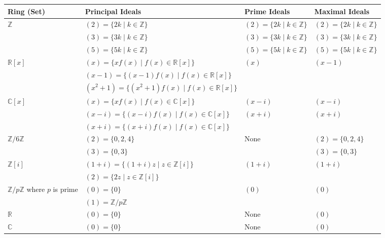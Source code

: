 \documentclass[11pt,openany]{article}
\begin{document}
	\begin{center}
		\begin{tabular}{|>{\centering\arraybackslash}m{4cm}|>{\centering\arraybackslash}m{4cm}|>{\centering\arraybackslash}m{4cm}|>{\centering\arraybackslash}m{4cm}|}
			\hline
			\textbf{Ring (Set)} & \textbf{Principal Ideals} & \textbf{Prime Ideals} & \textbf{Maximal Ideals} \\
			\hline
			\(\mathbb{Z}\) & \((2) = \{2k \mid k \in \mathbb{Z}\}\) & \((2) = \{2k \mid k \in \mathbb{Z}\}\) & \((2) = \{2k \mid k \in \mathbb{Z}\}\) \\
			& \((3) = \{3k \mid k \in \mathbb{Z}\}\) & \((3) = \{3k \mid k \in \mathbb{Z}\}\) & \((3) = \{3k \mid k \in \mathbb{Z}\}\) \\
			& \((5) = \{5k \mid k \in \mathbb{Z}\}\) & \((5) = \{5k \mid k \in \mathbb{Z}\}\) & \((5) = \{5k \mid k \in \mathbb{Z}\}\) \\
			\hline
			\(\mathbb{R}[x]\) & \((x) = \{x f(x) \mid f(x) \in \mathbb{R}[x]\}\) & \((x)\) & \((x-1)\) \\
			& \((x-1) = \{(x-1) f(x) \mid f(x) \in \mathbb{R}[x]\}\) &  &  \\
			& \((x^2+1) = \{(x^2+1) f(x) \mid f(x) \in \mathbb{R}[x]\}\) &  &  \\
			\hline
			\(\mathbb{C}[x]\) & \((x) = \{x f(x) \mid f(x) \in \mathbb{C}[x]\}\) & \((x-i)\) & \((x-i)\) \\
			& \((x-i) = \{(x-i) f(x) \mid f(x) \in \mathbb{C}[x]\}\) & \((x+i)\) & \((x+i)\) \\
			& \((x+i) = \{(x+i) f(x) \mid f(x) \in \mathbb{C}[x]\}\) &  &  \\
			\hline
			\(\mathbb{Z}/6\mathbb{Z}\) & \((2) = \{0, 2, 4\}\) & None & \((2) = \{0, 2, 4\}\) \\
			& \((3) = \{0, 3\}\) &  & \((3) = \{0, 3\}\) \\
			\hline
			\(\mathbb{Z}[i]\) & \((1+i) = \{(1+i) z \mid z \in \mathbb{Z}[i]\}\) & \((1+i)\) & \((1+i)\) \\
			& \((2) = \{2 z \mid z \in \mathbb{Z}[i]\}\) &  &  \\
			\hline
			\(\mathbb{Z}/p\mathbb{Z}\) where \(p\) is prime & \((0) = \{0\}\) & \((0)\) & \((0)\) \\
			& \((1) = \mathbb{Z}/p\mathbb{Z}\) &  &  \\
			\hline
			\(\mathbb{R}\) & \((0) = \{0\}\) & None & \((0)\) \\
			\hline
			\(\mathbb{C}\) & \((0) = \{0\}\) & None & \((0)\) \\

\end{tabular}
\end{center}
\end{document}
